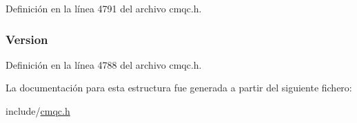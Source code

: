 Definición en la línea 4791 del archivo cmqc.\+h.

\hypertarget{structtag_m_q_p_d_a0656ef8f766b3907d394d88a35d7b7e9}{}
\subsubsection[{Version}]{ Version}\label{structtag_m_q_p_d_a0656ef8f766b3907d394d88a35d7b7e9}


Definición en la línea 4788 del archivo cmqc.\+h.



La documentación para esta estructura fue generada a partir del siguiente fichero\+:\begin{DoxyCompactItemize}
\item 
include/\hyperlink{cmqc_8h}{cmqc.\+h}\end{DoxyCompactItemize}
